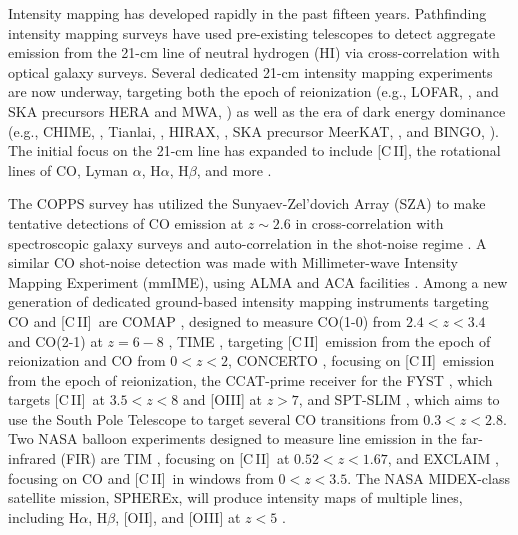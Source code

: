 \documentclass[fleqn,usenatbib]{mnras}
\newcommand{\cii}{[C{\sc\,II}]}
\begin{document}
Intensity mapping has developed rapidly in the past fifteen years. Pathfinding intensity mapping surveys have used pre-existing telescopes to detect aggregate emission from the 21-cm line of neutral hydrogen (HI) \citep{2009MNRAS.394L...6P, 2010Natur.466..463C, 2013ApJ...763L..20M, 2013MNRAS.434L..46S, 2017MNRAS.464.4938W, 2018MNRAS.476.3382A, 2021arXiv210204946W} via cross-correlation with optical galaxy surveys. Several dedicated 21-cm intensity mapping experiments are now underway, targeting both the epoch of reionization (e.g., LOFAR, \cite{2013A&A...556A...2V}, and SKA precursors HERA and MWA, \cite{DeBoer_2017,2018MNRAS.481.5034M}) as well as the era of dark energy dominance (e.g., CHIME, \cite{2014SPIE.9145E..22B}, Tianlai, \cite{2012IJMPS..12..256C}, HIRAX, \cite{2021arXiv210913755C}, SKA precursor MeerKAT, \cite{2021MNRAS.505.3698W}, and BINGO, \cite{2021arXiv210701633A}). The initial focus on the 21-cm line has expanded to include \cii, the rotational lines of CO, Lyman $\alpha$, H$\alpha$, H$\beta$, and more \citep{2019BAAS...51c.101K}. 

The COPPS survey has utilized the Sunyaev-Zel'dovich Array (SZA) to make tentative detections of CO emission at $z\sim2.6$ in cross-correlation with spectroscopic galaxy surveys \citep{2021arXiv211002239K} and auto-correlation in the shot-noise regime \citep{Keating_2016}. A similar CO shot-noise detection was made with Millimeter-wave Intensity Mapping Experiment (mmIME), using ALMA and ACA facilities \citep{Keating_2020}. Among a new generation of dedicated ground-based intensity mapping instruments targeting CO and \cii\ are COMAP \citep{2021arXiv211105927C}, designed to measure CO(1-0) from $2.4<z<3.4$ and CO(2-1) at $z=6-8$ , TIME \citep{2014SPIE.9153E..1WC}, targeting \cii\ emission from the epoch of reionization and CO from $0<z<2$, CONCERTO \citep{2020arXiv200714246T}, focusing on \cii\ emission from the epoch of reionization, the CCAT-prime receiver for the FYST \citep{2021arXiv210710364C}, which targets \cii\ at $3.5<z<8$ and [OIII] at $z>7$, and SPT-SLIM \citep{2022JLTP..tmp...61K}, which aims to use the South Pole Telescope to target several CO transitions from $0.3<z<2.8$. Two NASA balloon experiments designed to measure line emission in the far-infrared (FIR) are TIM \citep{2020arXiv200914340V}, focusing on \cii\ at $0.52<z<1.67$, and EXCLAIM \citep{2021arXiv210111734C}, focusing on CO and \cii\ in windows from $0<z<3.5$. The NASA MIDEX-class satellite mission, SPHEREx, will produce intensity maps of multiple lines, including H$\alpha$, H$\beta$, [OII], and [OIII] at $z<5$ \citep{2017ApJ...835..273G}.
\end{document}
